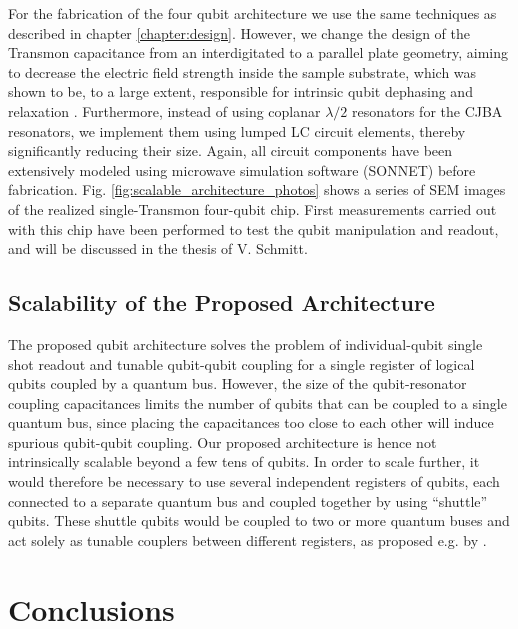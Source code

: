 For the fabrication of the four qubit architecture we use the same techniques as described in chapter \ref{chapter:design}. However, we change the design of the Transmon capacitance from an interdigitated to a parallel plate geometry, aiming to decrease the electric field strength inside the sample substrate, which was shown to be, to a large extent, responsible for intrinsic qubit dephasing and relaxation \citep{paik_observation_2011}. Furthermore, instead of using coplanar $\lambda/2$ resonators for the CJBA resonators, we implement them using lumped LC circuit elements, thereby significantly reducing their size. Again, all circuit components have been extensively modeled using microwave simulation software (SONNET) before fabrication. Fig. \ref{fig:scalable_architecture_photos} shows a series of SEM images of the realized single-Transmon four-qubit chip. First measurements carried out with this chip have been performed to test the qubit manipulation and readout, and will be discussed in the thesis of V. Schmitt.

\subsection{Scalability of the Proposed Architecture}

The proposed qubit architecture solves the problem of individual-qubit single shot readout and tunable qubit-qubit coupling for a single register of logical qubits coupled by a quantum bus. However, the size of the qubit-resonator coupling capacitances limits the number of qubits that can be coupled to a single quantum bus, since placing the capacitances too close to each other will induce spurious qubit-qubit coupling. Our proposed architecture is hence not intrinsically scalable beyond a few tens of qubits. In order to scale further, it would therefore be necessary to use several independent registers of qubits, each connected to a separate quantum bus and coupled together by using ``shuttle'' qubits. These shuttle qubits would be coupled to two or more quantum buses and act solely as tunable couplers between different registers, as proposed e.g. by \citep{divincenzo_physical_2000,palacios-laloy_superconducting_2010}.

\section{Conclusions}

